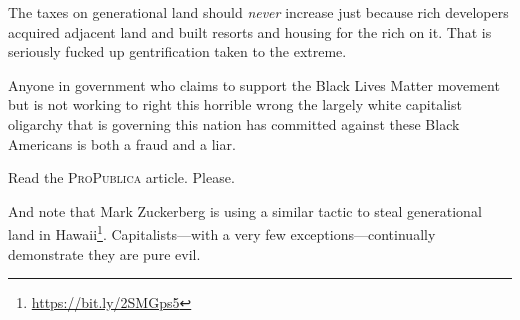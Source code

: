 The taxes on generational land should \emph{never} increase just because rich developers acquired adjacent land and built resorts and housing for the rich on it. That is seriously fucked up gentrification taken to the extreme.

Anyone in government who claims to support the Black Lives Matter movement but is not working to right this horrible wrong the largely white capitalist oligarchy that is governing this nation has committed against these Black Americans is both a fraud and a liar.

Read the \textsc{ProPublica} article. Please.

And note that Mark Zuckerberg is using a similar tactic to steal generational land in Hawaii\footnote{\url{https://bit.ly/2SMGps5}}. Capitalists---with a very few exceptions---continually demonstrate they are pure evil.
